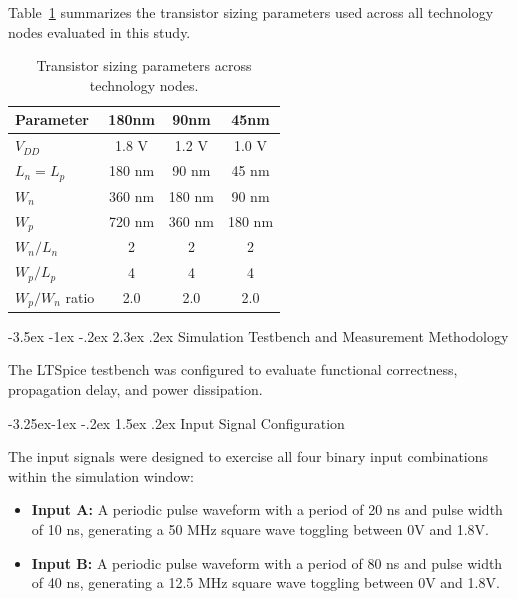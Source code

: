 \documentclass[12pt,a4paper,oneside]{report}
\makeatletter
\renewcommand\section{\@startsection {section}{1}{\z@}%
                                   {-3.5ex \@plus -1ex \@minus -.2ex}%
                                   {2.3ex \@plus.2ex}%
                                   {\normalfont\normalsize\bfseries}}
\renewcommand\subsection{\@startsection{subsection}{2}{\z@}%
                                     {-3.25ex\@plus -1ex \@minus -.2ex}%
                                     {1.5ex \@plus .2ex}%
                                     {\normalfont\normalsize\bfseries\itshape}}
\makeatother
\begin{document}
Table~\ref{tab:transistor_sizing} summarizes the transistor sizing parameters used across all technology nodes evaluated in this study.

\begin{table}[H]
\centering
\caption{Transistor sizing parameters across technology nodes.}
\label{tab:transistor_sizing}
\vspace{0.2cm}
\begin{tabular}{|l|c|c|c|}
\hline
\textbf{Parameter} & \textbf{180nm} & \textbf{90nm} & \textbf{45nm} \\
\hline
$V_{DD}$ & 1.8 V & 1.2 V & 1.0 V \\
\hline
$L_n = L_p$ & 180 nm & 90 nm & 45 nm \\
\hline
$W_n$ & 360 nm & 180 nm & 90 nm \\
\hline
$W_p$ & 720 nm & 360 nm & 180 nm \\
\hline
$W_n/L_n$ & 2 & 2 & 2 \\
\hline
$W_p/L_p$ & 4 & 4 & 4 \\
\hline
$W_p/W_n$ ratio & 2.0 & 2.0 & 2.0 \\
\hline
\end{tabular}
\end{table}

\section{Simulation Testbench and Measurement Methodology}

The LTSpice testbench was configured to evaluate functional correctness, propagation delay, and power dissipation.

\subsection{Input Signal Configuration}

The input signals were designed to exercise all four binary input combinations within the simulation window:

\begin{itemize}
\item \textbf{Input A:} A periodic pulse waveform with a period of 20 ns and pulse width of 10 ns, generating a 50 MHz square wave toggling between 0V and 1.8V.
\item \textbf{Input B:} A periodic pulse waveform with a period of 80 ns and pulse width of 40 ns, generating a 12.5 MHz square wave toggling between 0V and 1.8V.
\end{itemize}
\end{document}
